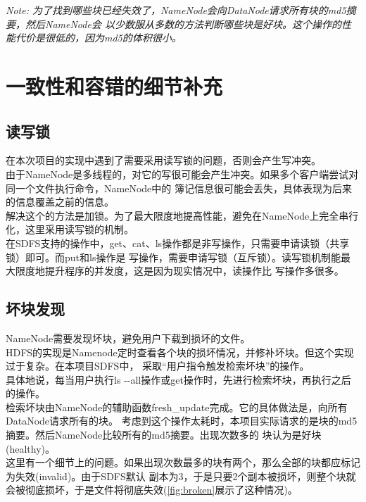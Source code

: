 \documentclass[a4paper]{article}
\begin{document}
\emph{Note: 为了找到哪些块已经失效了，NameNode会向DataNode请求所有块的md5摘要，然后NameNode会
以少数服从多数的方法判断哪些块是好块。这个操作的性能代价是很低的，因为md5的体积很小。}

\section{一致性和容错的细节补充}
\subsection{读写锁}
在本次项目的实现中遇到了需要采用读写锁的问题，否则会产生写冲突。\\

由于NameNode是多线程的，对它的写很可能会产生冲突。如果多个客户端尝试对同一个文件执行命令，NameNode中的
簿记信息很可能会丢失，具体表现为后来的信息覆盖之前的信息。\\

解决这个的方法是加锁。为了最大限度地提高性能，避免在NameNode上完全串行化，这里采用读写锁的机制。\\

在SDFS支持的操作中，get、cat、ls操作都是非写操作，只需要申请读锁（共享锁）即可。而put和ls操作是
写操作，需要申请写锁（互斥锁）。读写锁机制能最大限度地提升程序的并发度，这是因为现实情况中，读操作比
写操作多很多。
\subsection{坏块发现}
NameNode需要发现坏块，避免用户下载到损坏的文件。\\

HDFS的实现是Namenode定时查看各个块的损坏情况，并修补坏块。但这个实现过于复杂。在本项目SDFS中，
采取``用户指令触发检索坏块''的操作。\\

具体地说，每当用户执行ls -{}-all操作或get操作时，先进行检索坏块，再执行之后的操作。\\

检索坏块由NameNode的辅助函数fresh\_update完成。它的具体做法是，向所有DataNode请求所有的块。
考虑到这个操作太耗时，本项目实际请求的是块的md5摘要。然后NameNode比较所有的md5摘要。出现次数多的
块认为是好块(healthy)。\\

这里有一个细节上的问题。如果出现次数最多的块有两个，那么全部的块都应标记为失效(invalid)。由于SDFS默认
副本为3，于是只要2个副本被损坏，则整个块就会被彻底损坏，于是文件将彻底失效(\autoref{fig:broken}展示了这种情况)。\\
\end{document}
